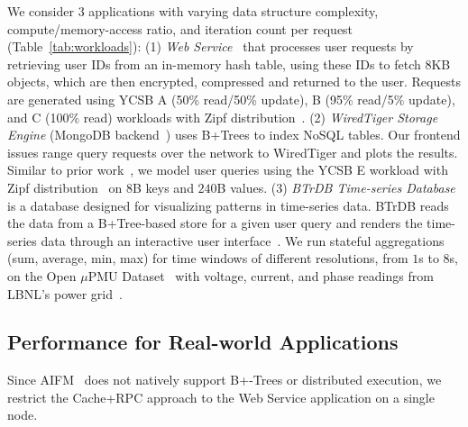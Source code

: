  We consider $3$ applications with varying data structure complexity, compute/memory-access ratio, and iteration count per request (Table~\ref{tab:workloads}): (1) \textit{Web Service}~\cite{aifm} that processes user requests by retrieving user IDs from an in-memory hash table, using these IDs to fetch 8KB objects, which are then encrypted, compressed and returned to the user. Requests are generated using YCSB A (50\% read/50\% update), B (95\% read/5\% update), and C (100\% read) workloads with Zipf distribution~\cite{ycsb_workload}. (2) \textit{WiredTiger Storage Engine} (MongoDB backend~\cite{mongodb}) uses B+Trees to index NoSQL tables. Our frontend issues range query requests over the network to WiredTiger and plots the results. Similar to prior work~\cite{aifm, xrp}, we model user queries using the YCSB E workload with Zipf distribution~\cite{ycsb_workload} on $8$B keys and $240$B values. (3) \textit{BTrDB Time-series Database}~\cite{btrdb} is a database designed for visualizing patterns in time-series data. BTrDB reads the data from a B+Tree-based store for a given user query and renders the time-series data through an interactive user interface~\cite{mrplotter}. We run stateful aggregations (sum, average, min, max) for time windows of different resolutions, from $1$s to $8$s, on the Open $\mu$PMU Dataset~\cite{upmu} with voltage, current, and phase readings from LBNL’s power grid~\cite{btrdb}.




\subsection{Performance for Real-world Applications} 
\label{ssec:application-study}


Since AIFM~\cite{aifm} does not natively support B+-Trees or distributed execution, we restrict the Cache+RPC approach to the Web Service application on a single node.


